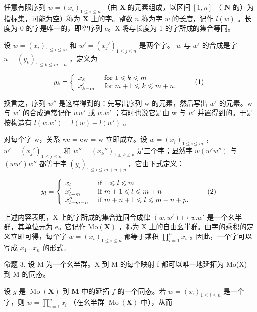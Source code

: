 任意有限序列 \(w = (x_{i})_{1 \leqslant i \leqslant n}\) （由 \(\mathbf{X}\) 的元素组成，以区间 \([1, n]\) （ \(\mathbf{N}\) 的）为指标集，可能为空）称为 \(\mathbf{X}\) 上的字。整数 \(n\) 称为字 \(w\) 的长度，记作 \(l(w)\) 。长度为 0 的字是唯一的，即空序列 e。X 将与长度为 1 的字所成的集合等同。

设 \(w = (x_{i})_{1 \leqslant i \leqslant m}\) 和 \(w' = (x_{j}')_{1 \leqslant j \leqslant n}\) 是两个字。 \(w\) 与 \(w'\) 的合成是字 \(u = (y_{k})_{1 \leqslant k \leqslant m + n}\) ，定义为

\[
y _ {k} = \left\{ \begin{array}{l l} x _ {k} & \text { for } 1 \leqslant k \leqslant m \\ x _ {k - m} ^ {\prime} & \text { for } m + 1 \leqslant k \leqslant m + n. \end{array} \right.\tag{1}
\]

换言之，序列 \(w''\) 是这样得到的：先写出序列 w 的元素，然后写出 \(w'\) 的元素。w 与 \(w'\) 的合成通常记作 \(ww'\) 或 \(w.w'\) ；有时也说它是由 w 与 \(w'\) 并置得到的。于是按构造有 \(l(w.w') = l(w) + l(w')\) 。

对每个字 w，关系 we = ew = w 立即成立。设 \(w = (x_{i})_{1 \leqslant i \leqslant m}\) ， \(w' = (x_{j}')_{1 \leqslant j \leqslant n}\) 和 \(w'' = (x_{k}'')_{1 \leqslant k \leqslant p}\) 是三个字；显然字 \(w(w'w'')\) 与 \((ww')w''\) 都等于字 \((y_{i})_{1 \leqslant i \leqslant m+n+p}\) ，它由下式定义：

\[
y _ {l} = \left\{ \begin{array}{l l} x _ {l} & \text { if } 1 \leqslant l \leqslant m \\ x _ {l - m} ^ {\prime} & \text { if } m + 1 \leqslant l \leqslant m + n \\ x _ {l - m - n} ^ {\prime \prime} & \text { if } m + n + 1 \leqslant l \leqslant m + n + p. \end{array} \right.\tag{2}
\]

上述内容表明，X 上的字所成的集合连同合成律 \((w, w') \mapsto w.w'\) 是一个幺半群，其单位元为 e。它记作 \(\mathrm{Mo}(\mathbf{X})\) ，称为 X 上的自由幺半群。由字的乘积的定义立即可得，每个字 \(w = (x_i)_{1 \leq i \leq n}\) 都等于乘积 \(\prod_{i=1}^{n} x_i\) 。因此，一个字可以写成 \(x_1 \ldots x_{n}\) 的形式。

命题 3. 设 M 为一个幺半群。X 到 M 的每个映射 f 都可以唯一地延拓为 Mo(X) 到 M 的同态。

设 \(g\) 是 \(\operatorname{Mo}(\mathbf{X})\) 到 \(\mathbf{M}\) 中的延拓 \(f\) 的一个同态。若 \(w = (x_{i})_{1 \leqslant i \leqslant n}\) 是一个字，则 \(w = \prod_{i=1}^{n} x_{i}\) （在幺半群 \(\operatorname{Mo}(\mathbf{X})\) 中），从而

